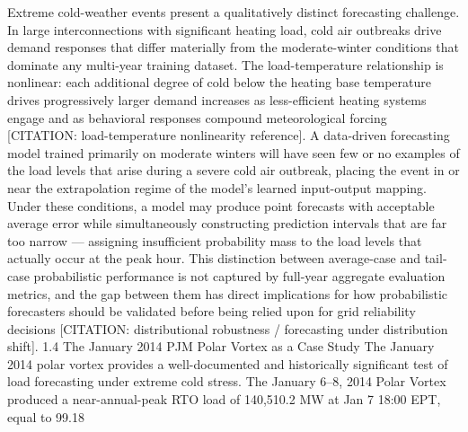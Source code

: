 Extreme cold-weather events present a qualitatively distinct forecasting challenge. In large interconnections with significant heating load, cold air outbreaks drive demand responses that differ materially from the moderate-winter conditions that dominate any multi-year training dataset. The load-temperature relationship is nonlinear: each additional degree of cold below the heating base temperature drives progressively larger demand increases as less-efficient heating systems engage and as behavioral responses compound meteorological forcing [CITATION: load-temperature nonlinearity reference]. A data-driven forecasting model trained primarily on moderate winters will have seen few or no examples of the load levels that arise during a severe cold air outbreak, placing the event in or near the extrapolation regime of the model's learned input-output mapping. Under these conditions, a model may produce point forecasts with acceptable average error while simultaneously constructing prediction intervals that are far too narrow — assigning insufficient probability mass to the load levels that actually occur at the peak hour. This distinction between average-case and tail-case probabilistic performance is not captured by full-year aggregate evaluation metrics, and the gap between them has direct implications for how probabilistic forecasters should be validated before being relied upon for grid reliability decisions [CITATION: distributional robustness / forecasting under distribution shift].
1.4 The January 2014 PJM Polar Vortex as a Case Study
The January 2014 polar vortex provides a well-documented and historically significant test of load forecasting under extreme cold stress. The January 6–8, 2014 Polar Vortex produced a near-annual-peak RTO load of 140,510.2 MW at Jan 7 18:00 EPT, equal to 99.18%
